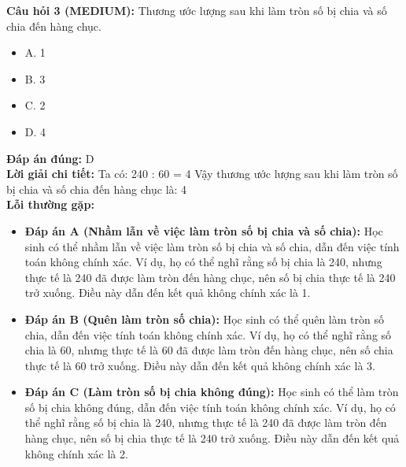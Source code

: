 \documentclass{article}
\begin{document}
\begin{minipage}{\textwidth}
\noindent\textbf{Câu hỏi 3 (MEDIUM):} Thương ước lượng sau khi làm tròn số bị chia và số chia đến hàng chục. 
\begin{itemize}[label={}]
    \item A. 1
    \item B. 3
    \item C. 2
    \item D. 4
\end{itemize}
\textbf{Đáp án đúng:} D \\
\textbf{Lời giải chi tiết:} Ta có: 240 : 60 = 4 Vậy thương ước lượng sau khi làm tròn số bị chia và số chia đến hàng chục là: 4 \\
\textbf{Lỗi thường gặp:}
\begin{itemize}
  \item \textbf{Đáp án A (Nhầm lẫn về việc làm tròn số bị chia và số chia):} Học sinh có thể nhầm lẫn về việc làm tròn số bị chia và số chia, dẫn đến việc tính toán không chính xác. Ví dụ, họ có thể nghĩ rằng số bị chia là 240, nhưng thực tế là 240 đã được làm tròn đến hàng chục, nên số bị chia thực tế là 240 trở xuống. Điều này dẫn đến kết quả không chính xác là 1.
  \item \textbf{Đáp án B (Quên làm tròn số chia):} Học sinh có thể quên làm tròn số chia, dẫn đến việc tính toán không chính xác. Ví dụ, họ có thể nghĩ rằng số chia là 60, nhưng thực tế là 60 đã được làm tròn đến hàng chục, nên số chia thực tế là 60 trở xuống. Điều này dẫn đến kết quả không chính xác là 3.
  \item \textbf{Đáp án C (Làm tròn số bị chia không đúng):} Học sinh có thể làm tròn số bị chia không đúng, dẫn đến việc tính toán không chính xác. Ví dụ, họ có thể nghĩ rằng số bị chia là 240, nhưng thực tế là 240 đã được làm tròn đến hàng chục, nên số bị chia thực tế là 240 trở xuống. Điều này dẫn đến kết quả không chính xác là 2.
\end{itemize}
\end{minipage}
\vspace{1em}
\end{document}
